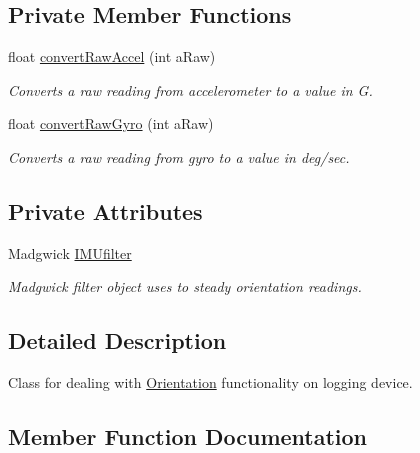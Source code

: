 \subsection*{Private Member Functions}
\begin{DoxyCompactItemize}
\item 
float \hyperlink{class_logging_device_1_1_orientation_ab8a6f65b7f2b43ec5dd09c47fe93fa0b}{convert\+Raw\+Accel} (int a\+Raw)
\begin{DoxyCompactList}\small\item\em Converts a raw reading from accelerometer to a value in G. \end{DoxyCompactList}\item 
float \hyperlink{class_logging_device_1_1_orientation_a99bb5ed3c3226c5d636fa48f26f491dd}{convert\+Raw\+Gyro} (int a\+Raw)
\begin{DoxyCompactList}\small\item\em Converts a raw reading from gyro to a value in deg/sec. \end{DoxyCompactList}\end{DoxyCompactItemize}
\subsection*{Private Attributes}
\begin{DoxyCompactItemize}
\item 
\mbox{\label{class_logging_device_1_1_orientation_a517282a58a498881d97d57f4829a38d9}} 
Madgwick \hyperlink{class_logging_device_1_1_orientation_a517282a58a498881d97d57f4829a38d9}{I\+M\+Ufilter}
\begin{DoxyCompactList}\small\item\em Madgwick filter object uses to steady orientation readings. \end{DoxyCompactList}\end{DoxyCompactItemize}


\subsection{Detailed Description}
Class for dealing with \hyperlink{class_logging_device_1_1_orientation}{Orientation} functionality on logging device. 

\subsection{Member Function Documentation}
\mbox{\label{class_logging_device_1_1_orientation_ab8a6f65b7f2b43ec5dd09c47fe93fa0b}} 
